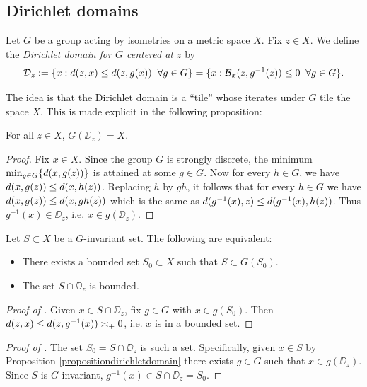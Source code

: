 \subsection{Dirichlet domains}

\begin{definition}
\label{definitiondirichletdomain}
Let $G$ be a group acting by isometries on a metric space $X$. Fix $z\in X$. We define the \emph{Dirichlet domain for $G$ centered at $z$} by
\begin{equation}
\label{dirichletdomain}
\mathcal D_z := \{ x : d(z,x) \leq d(z,g(x)) \;\;\forall g\in G\} = \{x : \operatorname{\mathcal B}_x(z,g^{-1}(z))\leq 0 \;\;\forall g\in G\}.
\end{equation}
\end{definition}


The idea is that the Dirichlet domain is a ``tile'' whose iterates under $G$ tile the space $X$. This is made explicit in the following proposition:

\begin{proposition}
\label{propositiondirichletdomain}
For all $z\in X$, $G(\DD_z) = X$.
\end{proposition}
\begin{proof} 
Fix $x\in X$. Since the group $G$ is strongly discrete, the minimum $\min_{g\in G}\{ d(x,g(z)) \}$ is attained at some $g\in G$. Now for every $h\in G$, we have $d(x,g(z)) \leq d(x,h(z))$. Replacing $h$ by $gh$, it follows that for every $h\in G$ we have $d(x,g(z)) \leq d(x,gh(z))$ which is the same as $d(g^{-1}(x),z) \leq d(g^{-1}(x),h(z))$. Thus $g^{-1}(x)\in\DD_z$, i.e. $x\in g(\DD_z)$.
\end{proof}



\begin{corollary}
\label{corollarydirichletdomain}
Let $S\subset X$ be a $G$-invariant set. The following are equivalent:
\begin{itemize}
\item[(A)] There exists a bounded set $S_0\subset X$ such that $S\subset G(S_0)$.
\item[(B)] The set $S\cap\DD_z$ is bounded.
\end{itemize}
\end{corollary}
\begin{proof}[Proof of  \implies {}]
Given $x\in S\cap\DD_z$, fix $g\in G$ with $x\in g(S_0)$. Then $d(z,x) \leq d(z,g^{-1}(x)) \asymp_+ 0$, i.e. $x$ is in a bounded set.
\end{proof}
\begin{proof}[Proof of  \implies {}]
The set $S_0 = S\cap\DD_z$ is such a set. Specifically, given $x\in S$ by Proposition \ref{propositiondirichletdomain} there exists $g\in G$ such that $x\in g(\DD_z)$. Since $S$ is $G$-invariant, $g^{-1}(x)\in S\cap \DD_z = S_0$.
\end{proof}



